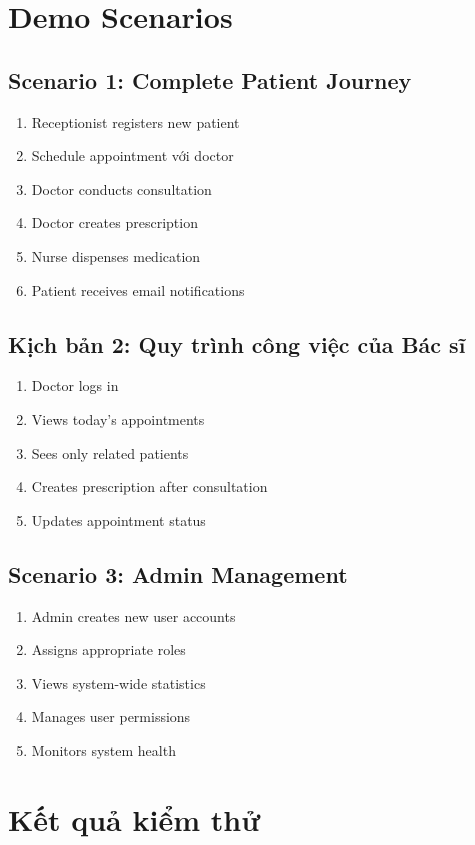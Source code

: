 \documentclass[12pt,a4paper]{report}
\begin{document}
\section{Demo Scenarios}

\subsection{Scenario 1: Complete Patient Journey}
\begin{enumerate}
    \item Receptionist registers new patient
    \item Schedule appointment với doctor
    \item Doctor conducts consultation
    \item Doctor creates prescription
    \item Nurse dispenses medication
    \item Patient receives email notifications
\end{enumerate}

\subsection{Kịch bản 2: Quy trình công việc của Bác sĩ}
\begin{enumerate}
    \item Doctor logs in
    \item Views today's appointments
    \item Sees only related patients
    \item Creates prescription after consultation
    \item Updates appointment status
\end{enumerate}

\subsection{Scenario 3: Admin Management}
\begin{enumerate}
    \item Admin creates new user accounts
    \item Assigns appropriate roles
    \item Views system-wide statistics
    \item Manages user permissions
    \item Monitors system health
\end{enumerate}

\section{Kết quả kiểm thử}
\end{document}
